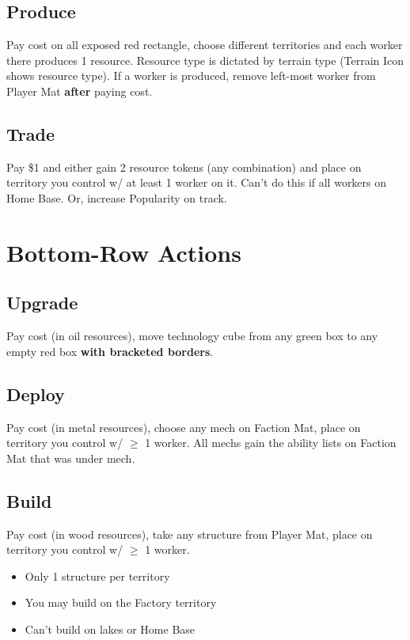 \documentclass[12pt]{article}
\newenvironment{itemizeCustom}
{\begin{itemize}
  \setlength{\itemsep}{1pt}
  \setlength{\parskip}{0pt}
  \setlength{\parsep}{0pt}}
{\end{itemize}}
\begin{document}
\begin{multicols*}{2}
\subsection*{Produce}
Pay cost on all exposed red rectangle, choose different territories and each worker there produces 1 resource. Resource type is dictated by terrain type (Terrain Icon shows resource type). If a worker is produced, remove left-most worker from Player Mat \textbf{after} paying cost.

\subsection*{Trade}
Pay \$1 and either gain 2 resource tokens (any combination) and place on territory you control w/ at least 1 worker on it. Can't do this if all workers on Home Base. Or, increase Popularity on track.

\section*{Bottom-Row Actions}
\subsection*{Upgrade}
Pay cost (in oil resources), move technology cube from any green box to any empty red box \textbf{with bracketed borders}.

\subsection*{Deploy}
Pay cost (in metal resources), choose any mech on Faction Mat, place on territory you control w/ $\geq$ 1 worker. All mechs gain the ability lists on Faction Mat that was under mech.

\subsection*{Build}
Pay cost (in wood resources), take any structure from Player Mat, place on territory you control w/ $\geq$ 1 worker.

\begin{itemizeCustom}
    \item Only 1 structure per territory
    \item You may build on the Factory territory
    \item Can't build on lakes or Home Base
\end{itemizeCustom}



\end{multicols*}
\end{document}
